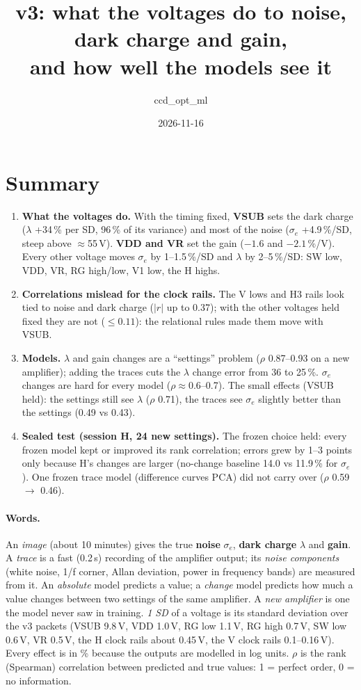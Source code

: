 \documentclass[11pt]{article}
\title{v3: what the voltages do to noise, dark charge and gain,\\ and how well the models see it}
\author{ccd\_opt\_ml}
\date{2026-11-16}
\begin{document}
\maketitle

\section*{Summary}
\begin{enumerate}
\item \textbf{What the voltages do.} With the timing fixed, \textbf{VSUB} sets the dark charge ($\lambda$ +34\,\% per SD,
  96\,\% of its variance) and most of the noise ($\sigma_e$ +4.9\,\%/SD, steep above $\approx$55\,V). \textbf{VDD and VR} set
  the gain ($-1.6$ and $-2.1$\,\%/V). Every other voltage moves $\sigma_e$ by 1--1.5\,\%/SD and $\lambda$ by 2--5\,\%/SD:
  SW low, VDD, VR, RG high/low, V1 low, the H highs.
\item \textbf{Correlations mislead for the clock rails.} The V lows and H3 rails look tied to noise and dark charge
  ($|r|$ up to 0.37); with the other voltages held fixed they are not ($\le0.11$): the relational rules made them move
  with VSUB.
\item \textbf{Models.} $\lambda$ and gain changes are a ``settings'' problem ($\rho$ 0.87--0.93 on a new amplifier);
  adding the traces cuts the $\lambda$ change error from 36 to 25\,\%. $\sigma_e$ changes are hard for every model
  ($\rho\approx0.6$--0.7). The small effects (VSUB held): the settings still see $\lambda$ ($\rho$ 0.71), the traces see
  $\sigma_e$ slightly better than the settings (0.49 vs 0.43).
\item \textbf{Sealed test (session H, 24 new settings).} The frozen choice held: every frozen model kept or improved its
  rank correlation; errors grew by 1--3 points only because H's changes are larger (no-change baseline 14.0 vs 11.9\,\%
  for $\sigma_e$). One frozen trace model (difference curves PCA) did not carry over ($\rho$ 0.59 $\to$ 0.46).
\end{enumerate}


\paragraph{Words.} An \emph{image} (about 10 minutes) gives the true \textbf{noise} $\sigma_e$, \textbf{dark charge}
$\lambda$ and \textbf{gain}. A \emph{trace} is a fast (0.2\,s) recording of the amplifier output; its \emph{noise
components} (white noise, 1/f corner, Allan deviation, power in frequency bands) are measured from it.
An \emph{absolute} model predicts a value; a \emph{change} model predicts how much a value changes between two settings
of the same amplifier. A \emph{new amplifier} is one the model never saw in training. \emph{1 SD} of a voltage is its
standard deviation over the v3 packets (VSUB 9.8\,V, VDD 1.0\,V, RG low 1.1\,V, RG high 0.7\,V, SW low 0.6\,V, VR
0.5\,V, the H clock rails about 0.45\,V, the V clock rails 0.1--0.16\,V). Every effect is in \% because the outputs are
modelled in log units. $\rho$ is the rank (Spearman) correlation between predicted and true values: 1 = perfect order,
0 = no information.
\end{document}
